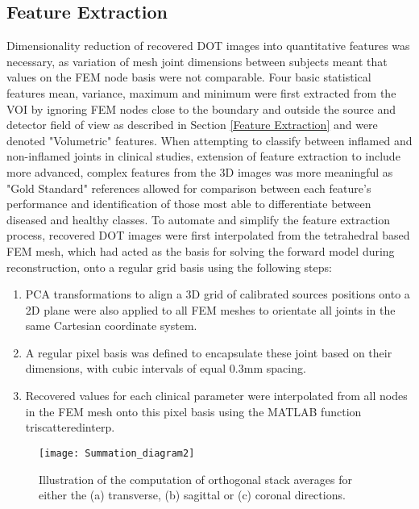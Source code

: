 \documentclass[twoside]{bhamthesis}
\theoremstyle{definition}
\begin{document}
\subsection{Feature Extraction}
\label{Feature Extraction Patient}

Dimensionality reduction of recovered DOT images into quantitative features was necessary, as variation of mesh joint dimensions between subjects meant that values on the FEM node basis were not comparable. Four basic statistical features mean, variance, maximum and minimum were first extracted from the VOI by ignoring FEM nodes close to the boundary and outside the source and detector field of view as described in Section \ref{Feature Extraction} and were denoted "Volumetric" features. When attempting to classify between inflamed and non-inflamed joints in clinical studies, extension of feature extraction to include more advanced, complex features from the 3D images was more meaningful as "Gold Standard" references allowed for comparison between each feature's performance and identification of those most able to differentiate between diseased and healthy classes. To automate and simplify the feature extraction process, recovered DOT images were first interpolated from the tetrahedral based FEM mesh, which had acted as the basis for solving the forward model during reconstruction, onto a regular grid basis using the following steps:

\begin{enumerate}
\item PCA transformations to align a 3D grid of calibrated sources positions onto a 2D plane were also applied to all FEM meshes to orientate all joints in the same Cartesian coordinate system.
\item A regular pixel basis was defined to encapsulate these joint based on their dimensions, with cubic intervals of equal 0.3mm spacing.
\item Recovered values for each clinical parameter were interpolated from all nodes in the FEM mesh onto this pixel basis using the MATLAB function triscatteredinterp. 
\end{enumerate}

\begin{figure}[!ht]
\centering\texttt{[image: Summation\_diagram2]}
\caption{Illustration of the computation of orthogonal stack averages for either the (a) transverse, (b) sagittal or (c) coronal directions.}
\label{Summation_diagram}
\end{figure}
\end{document}
